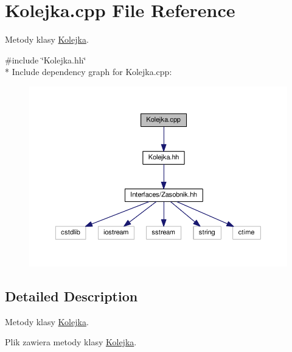 \hypertarget{a00045}{}\section{Kolejka.\+cpp File Reference}
\label{a00045}


Metody klasy \hyperlink{a00013}{Kolejka}.  


{\ttfamily \#include \char`\"{}Kolejka.\+hh\char`\"{}}\\*
Include dependency graph for Kolejka.\+cpp\+:
\nopagebreak
\begin{figure}[H]
\begin{center}
\leavevmode
\includegraphics[width=350pt]{a00097}
\end{center}
\end{figure}


\subsection{Detailed Description}
Metody klasy \hyperlink{a00013}{Kolejka}. 

Plik zawiera metody klasy \hyperlink{a00013}{Kolejka}. 